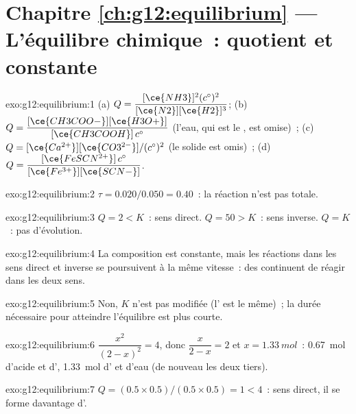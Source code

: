 \section*{Chapitre \ref{ch:g12:equilibrium} --- L'équilibre chimique~: quotient et constante}

\begin{solution}{exo:g12:equilibrium:1}
(a) $Q = \dfrac{[\ce{NH3}]^2 (c^\circ)^2}{[\ce{N2}][\ce{H2}]^3}$;
(b) $Q = \dfrac{[\ce{CH3COO-}][\ce{H3O+}]}{[\ce{CH3COOH}]\,c^\circ}$ (l'eau,
qui est le , est omise)~;
(c) $Q = [\ce{Ca^{2+}}][\ce{CO3^{2-}}]/(c^\circ)^2$ (le solide est
omis)~;
(d) $Q = \dfrac{[\ce{FeSCN^{2+}}]\,c^\circ}{[\ce{Fe^{3+}}][\ce{SCN-}]}$.
\end{solution}

\begin{solution}{exo:g12:equilibrium:2}
$\tau = 0.020/0.050 = 0.40$~: la réaction n'est pas totale.
\end{solution}

\begin{solution}{exo:g12:equilibrium:3}
$Q = 2 < K$~: sens direct. $Q = 50 > K$~: sens inverse. $Q = K$~: pas
d'évolution.
\end{solution}

\begin{solution}{exo:g12:equilibrium:4}
La composition est constante, mais les réactions dans les sens direct et
inverse se poursuivent à la même vitesse~: des  continuent de
réagir dans les deux sens.
\end{solution}

\begin{solution}{exo:g12:equilibrium:5}
Non, $K$ n'est pas modifiée (l' est le même)~; la durée
nécessaire pour atteindre l'équilibre est plus courte.
\end{solution}

\begin{solution}{exo:g12:equilibrium:6}
$\dfrac{x^2}{(2-x)^2} = 4$, donc $\dfrac{x}{2-x} = 2$ et
$x = \qty{1.33}{mol}$~: \qty{0.67}{mol} d'acide et d',
\qty{1.33}{mol} d' et d'eau (de nouveau les deux tiers).
\end{solution}

\begin{solution}{exo:g12:equilibrium:7}
$Q = (0.5 \times 0.5)/(0.5 \times 0.5) = 1 < 4$~: sens direct, il se
forme davantage d'.
\end{solution}

